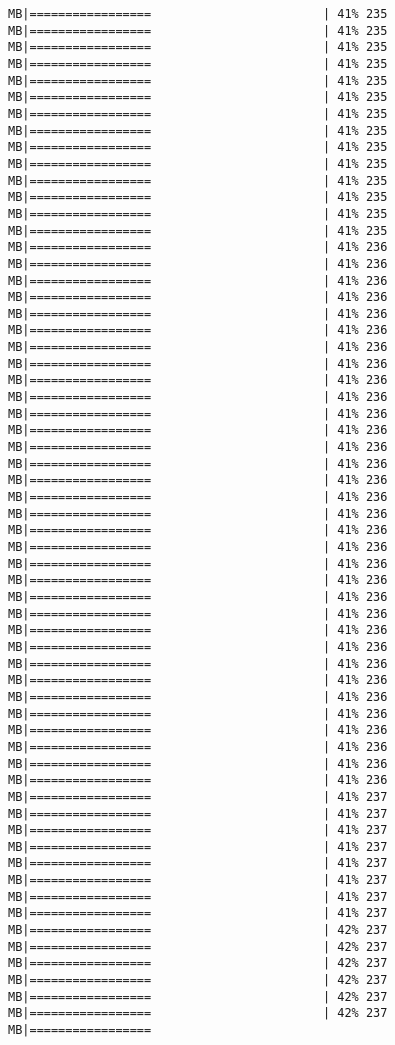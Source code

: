 \documentclass[
]{article}
\begin{document}
\begin{verbatim}
MB|=================                        | 41% 235 MB|=================                        | 41% 235 MB|=================                        | 41% 235 MB|=================                        | 41% 235 MB|=================                        | 41% 235 MB|=================                        | 41% 235 MB|=================                        | 41% 235 MB|=================                        | 41% 235 MB|=================                        | 41% 235 MB|=================                        | 41% 235 MB|=================                        | 41% 235 MB|=================                        | 41% 235 MB|=================                        | 41% 235 MB|=================                        | 41% 235 MB|=================                        | 41% 236 MB|=================                        | 41% 236 MB|=================                        | 41% 236 MB|=================                        | 41% 236 MB|=================                        | 41% 236 MB|=================                        | 41% 236 MB|=================                        | 41% 236 MB|=================                        | 41% 236 MB|=================                        | 41% 236 MB|=================                        | 41% 236 MB|=================                        | 41% 236 MB|=================                        | 41% 236 MB|=================                        | 41% 236 MB|=================                        | 41% 236 MB|=================                        | 41% 236 MB|=================                        | 41% 236 MB|=================                        | 41% 236 MB|=================                        | 41% 236 MB|=================                        | 41% 236 MB|=================                        | 41% 236 MB|=================                        | 41% 236 MB|=================                        | 41% 236 MB|=================                        | 41% 236 MB|=================                        | 41% 236 MB|=================                        | 41% 236 MB|=================                        | 41% 236 MB|=================                        | 41% 236 MB|=================                        | 41% 236 MB|=================                        | 41% 236 MB|=================                        | 41% 236 MB|=================                        | 41% 236 MB|=================                        | 41% 236 MB|=================                        | 41% 236 MB|=================                        | 41% 237 MB|=================                        | 41% 237 MB|=================                        | 41% 237 MB|=================                        | 41% 237 MB|=================                        | 41% 237 MB|=================                        | 41% 237 MB|=================                        | 41% 237 MB|=================                        | 41% 237 MB|=================                        | 42% 237 MB|=================                        | 42% 237 MB|=================                        | 42% 237 MB|=================                        | 42% 237 MB|=================                        | 42% 237 MB|=================                        | 42% 237 MB|=================     
\end{verbatim}
\end{document}
